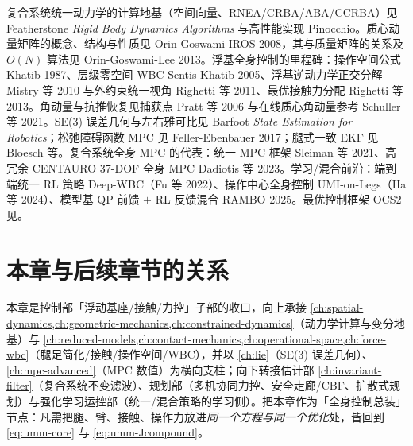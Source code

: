 复合系统统一动力学的计算地基（空间向量、RNEA/CRBA/ABA/CCRBA）见 Featherstone \emph{Rigid Body Dynamics Algorithms}\cite{featherstone2008rigid} 与高性能实现 Pinocchio\cite{carpentier2019pinocchio}。质心动量矩阵的概念、结构与性质见 Orin-Goswami IROS 2008\cite{orin2008centroidal}，其与质量矩阵的关系及 $O(N)$ 算法见 Orin-Goswami-Lee 2013\cite{orin2013centroidal}。浮基全身控制的里程碑：操作空间公式 Khatib 1987\cite{khatib1987unified}、层级零空间 WBC Sentis-Khatib 2005\cite{sentis2005synthesis}、浮基逆动力学正交分解 Mistry 等 2010\cite{mistry2010inverse} 与外约束统一视角 Righetti 等 2011\cite{righetti2011inverse}、最优接触力分配 Righetti 等 2013\cite{righetti2013optimal}。角动量与抗推恢复见捕获点 Pratt 等 2006\cite{pratt2006capture} 与在线质心角动量参考 Schuller 等 2021\cite{schuller2021online}。SE(3) 误差几何与左右雅可比见 Barfoot \emph{State Estimation for Robotics}\cite{barfoot2024state}；松弛障碍函数 MPC 见 Feller-Ebenbauer 2017\cite{feller2017relaxed}；腿式一致 EKF 见 Bloesch 等\cite{bloesch2013state}。复合系统全身 MPC 的代表：统一 MPC 框架 Sleiman 等 2021\cite{sleiman2021unified}、高冗余 CENTAURO 37-DOF 全身 MPC Dadiotis 等 2023\cite{dadiotis2023wholebody}。学习/混合前沿：端到端统一 RL 策略 Deep-WBC（Fu 等 2022\cite{fu2022deep}）、操作中心全身控制 UMI-on-Legs（Ha 等 2024\cite{ha2024umi}）、模型基 QP 前馈 $+$ RL 反馈混合 RAMBO 2025\cite{rambo2025}。最优控制框架 OCS2 见\cite{ocs2library}。

\section*{本章与后续章节的关系}

本章是控制部「浮动基座/接触/力控」子部的收口，向上承接 \cref{ch:spatial-dynamics,ch:geometric-mechanics,ch:constrained-dynamics}（动力学计算与变分地基）与 \cref{ch:reduced-models,ch:contact-mechanics,ch:operational-space,ch:force-wbc}（腿足简化/接触/操作空间/WBC），并以 \cref{ch:lie}（SE(3) 误差几何）、\cref{ch:mpc-advanced}（MPC 数值）为横向支柱；向下转接估计部 \cref{ch:invariant-filter}（复合系统不变滤波）、规划部（多机协同力控、安全走廊/CBF、扩散式规划）与强化学习运控部（统一/混合策略的学习侧）。把本章作为「全身控制总装」节点：凡需把腿、臂、接触、操作力放进\emph{同一个方程与同一个优化}处，皆回到 \cref{eq:umm-core} 与 \cref{eq:umm-Jcompound}。
